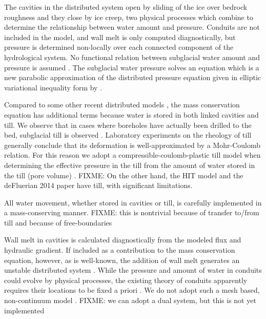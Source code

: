 \documentclass[gmd]{copernicus}   %
\begin{document}
The cavities in the distributed system open by sliding of the ice over bedrock roughness and they close by ice creep, two physical processes which combine to determine the relationship between water amount and pressure.  Conduits are not included in the model, and wall melt is only computed diagnostically, but pressure is determined non-locally over each connected component of the hydrological system.  No functional relation between subglacial water amount and pressure is assumed \citep[compare][]{FlowersClarke2002_theory}.  The subglacial water pressure solves an equation which is a new parabolic approximation of the distributed pressure equation given in elliptic variational inequality form by \cite{Schoofetal2012}.

Compared to some other recent distributed models \citep{Hewitt2013,Schoofetal2012}, the mass conservation equation has additional terms because water is stored in both linked cavities and till.  We observe that in cases where boreholes have actually been drilled to the bed, subglacial till is observed \citep{Hookeetal1997,TrufferHarrisonEchelmeyer2000,TrufferHarrison2006,Tulaczyketal2000}.  Laboratory experiments on the rheology of till \citep{Hookeetal1997,TrufferEchelmeyerHarrison2001,Tulaczyketal2000} generally conclude that its deformation is well-approximated by a Mohr-Coulomb relation.  For this reason we adopt a compressible-coulomb-plastic till model when determining the effective pressure in the till from the amount of water stored in the till (pore volume) \citep{Tulaczyketal2000}.  FIXME: On the other hand, the HIT model and the deFluerian 2014 paper have till, with significant limitations.

All water movement, whether stored in cavities or till, is carefully implemented in a mass-conserving manner.  FIXME: this is nontrivial because of transfer to/from till and because of free-boundaries

Wall melt in cavities is calculated diagnostically from the modeled flux and hydraulic gradient.  If included as a contribution to the mass conservation equation, however, as is well-known, the addition of wall melt generates an unstable distributed system \citep{Walder1982}.  While the pressure and amount of water in conduits could evolve by physical processes, the existing theory of conduits apparently requires their locations to be fixed a priori \citep{Hewittetal2012,PimentelFlowers2011,Schoofmeltsupply}.  We do not adopt such a mesh based, non-continuum model \citep[compare][]{Hewittetal2012}.  FIXME: we can adopt a dual system, but this is not yet implemented
\end{document}

